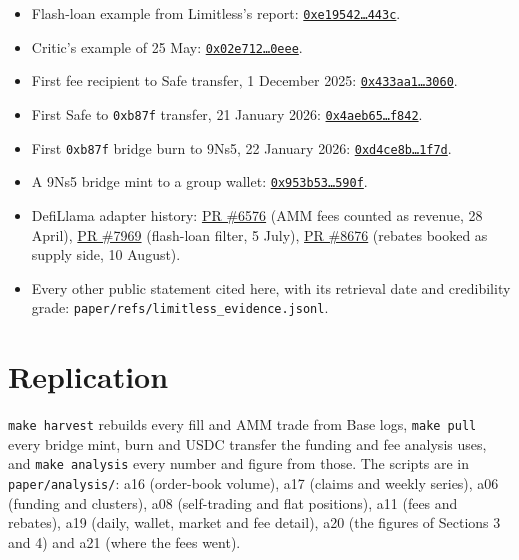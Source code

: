 \documentclass[11pt]{article}
\begin{document}
\begin{itemize}
\item Flash-loan example from Limitless's report: \href{https://basescan.org/tx/0xe19542e6b7f50638eea02c43eca08f888f0e3b8848f55af727f92243caed443c}{\texttt{0xe19542\ldots 443c}}.
\item Critic's example of 25 May: \href{https://basescan.org/tx/0x02e71256253919dbb522ec8cc6aefa003b5223efeb4e2b2087c1e6df82f40eee}{\texttt{0x02e712\ldots 0eee}}.
\item First fee recipient to Safe transfer, 1 December 2025: \href{https://basescan.org/tx/0x433aa1da65cc64ff0be7d75ab7ddc43f4f8838e02340be12989f8bb9db8e3060}{\texttt{0x433aa1\ldots 3060}}.
\item First Safe to \texttt{0xb87f} transfer, 21 January 2026: \href{https://basescan.org/tx/0x4aeb6542c38640122c7eec452ea723f9dc1a76b22a5499a6b85d73fd9f19f842}{\texttt{0x4aeb65\ldots f842}}.
\item First \texttt{0xb87f} bridge burn to 9Ns5, 22 January 2026: \href{https://basescan.org/tx/0xd4ce8bd303feeb1c083ea9da532f344e64e8e140c5d926c1c683c22678541f7d}{\texttt{0xd4ce8b\ldots 1f7d}}.
\item A 9Ns5 bridge mint to a group wallet: \href{https://basescan.org/tx/0x953b53db11a6493ecfd60391171106a4e61f52821bae6d8faebd95e1b3e9590f}{\texttt{0x953b53\ldots 590f}}.
\item DefiLlama adapter history: \href{https://github.com/DefiLlama/dimension-adapters/pull/6576}{PR \#6576} (AMM fees counted as revenue, 28 April), \href{https://github.com/DefiLlama/dimension-adapters/pull/7969}{PR \#7969} (flash-loan filter, 5 July), \href{https://github.com/DefiLlama/dimension-adapters/pull/8676}{PR \#8676} (rebates booked as supply side, 10 August).
\item Every other public statement cited here, with its retrieval date and credibility grade: \nolinkurl{paper/refs/limitless_evidence.jsonl}.
\end{itemize}

\section{Replication}

\texttt{make harvest} rebuilds every fill and AMM trade from Base logs, \texttt{make pull} every bridge mint, burn and USDC transfer the funding and fee analysis uses, and \texttt{make analysis} every number and figure from those.
The scripts are in \texttt{paper/analysis/}: a16 (order-book volume), a17 (claims and weekly series), a06 (funding and clusters), a08 (self-trading and flat positions), a11 (fees and rebates), a19 (daily, wallet, market and fee detail), a20 (the figures of Sections 3 and 4) and a21 (where the fees went).
\end{document}
